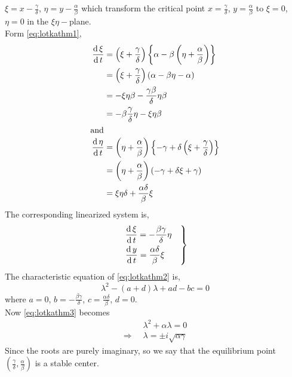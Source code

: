 \documentclass[../main-sheet.tex]{subfiles}
\begin{document}
\begin{soln}
    \(\xi =x-\frac{\gamma}{\delta}\), \(\eta=y-\frac{\alpha}{\beta}\) which transform the critical point \(x=\frac{\gamma}{\delta}\), \(y=\frac{\alpha}{\beta}\) to \(\xi=0\), \(\eta=0\) in the \(\xi\eta-\)plane.\\
    Form \eqref{eq:lotkathm1},
    \begin{align*}
        \,\frac{\mathrm{d}\,\xi}{\mathrm{d}\,t}&=\left( \xi+\frac{\gamma}{\delta} \right)\left\{ \alpha-\beta\left( \eta+\frac{\alpha}{\beta} \right) \right\}\\
        &=\left( \xi+\frac{\gamma}{\delta} \right)\left( \alpha-\beta\eta-\alpha \right)\\
        &=-\xi\eta\beta-\frac{\gamma\beta}{\delta}\eta\beta\\
        &=-\beta\frac{\gamma}{\delta}\eta-\xi\eta\beta\\
        \intertext{and}
        \,\frac{\mathrm{d}\,\eta}{\mathrm{d}\,t}&=\left( \eta+\frac{\alpha}{\beta} \right)\left\{ -\gamma+\delta\left( \xi+\frac{\gamma}{\delta} \right) \right\}\\
        &=\left( \eta+\frac{\alpha}{\beta} \right)\left( -\gamma+\delta\xi+\gamma \right)\\
        &=\xi\eta\delta+\frac{\alpha\delta}{\beta}\xi
    \end{align*}
    The corresponding linearized system is,
    \begin{equation}
        \begin{rcases}
            \displaystyle\,\frac{\mathrm{d}\,\xi}{\mathrm{d}\,t}=-\frac{\beta\gamma}{\delta}\eta\quad\\
            \displaystyle\,\frac{\mathrm{d}\,y}{\mathrm{d}\,t}=\frac{\alpha\delta}{\beta}\xi
        \end{rcases}
        \label{eq:lotkathm2}
    \end{equation}
    The characteristic equation of \eqref{eq:lotkathm2} is,
    \begin{equation}
        \lambda^2-(a+d)\lambda+ad-bc=0\label{eq:lotkathm3}
    \end{equation}
    where \(a=0\), \(b=-\frac{\beta\gamma}{\delta}\), \(c=\frac{\alpha\delta}{\beta}\), \(d=0\).\\
    Now \eqref{eq:lotkathm3} becomes
    \begin{align*}
        &\lambda^2+\alpha\lambda=0\\
        \Rightarrow\;\;&\lambda=\pm i\sqrt{\alpha\gamma}
    \end{align*}
    Since the roots are purely imaginary, so we say that the equilibrium point \(\left( \frac{\gamma}{\delta},\frac{\alpha}{\beta} \right)\) is a stable center.

\end{soln}
\end{document}
